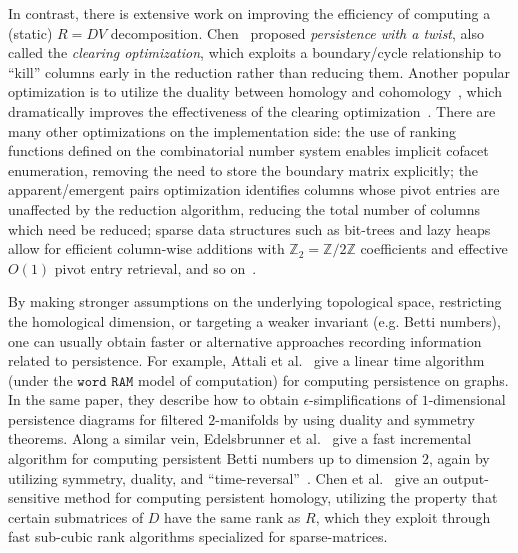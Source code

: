 \documentclass[sn-mathphys]{sn-jnl}
\begin{document}
In contrast, there is extensive work  on improving the efficiency of computing a (static) $R = DV$ decomposition. Chen~\cite{chen2011persistent} proposed \emph{persistence with a twist}, also called the \emph{clearing optimization}, which exploits a boundary/cycle relationship to ``kill'' columns early in the reduction rather than reducing them. 
Another popular optimization is to utilize the duality between   homology and cohomology~\cite{de2011dualities}, which dramatically improves the effectiveness of the clearing optimization~\cite{bauer2021ripser}. 
There are many other optimizations on the implementation side: the use of ranking functions defined on the combinatorial number system enables implicit cofacet enumeration, removing the need to store the boundary matrix explicitly; the apparent/emergent pairs optimization identifies columns whose pivot entries are unaffected by the reduction algorithm, reducing the total number of columns which need be reduced; sparse data structures such as bit-trees and lazy heaps allow for efficient column-wise additions with $\mathbb{Z}_2 = \mathbb{Z}/2\mathbb{Z}$ coefficients and effective $O(1)$ pivot entry retrieval, and so on~\cite{bauer2021ripser, bauer2017phat}. 

By making stronger assumptions on the underlying topological space, restricting the homological dimension, or targeting  a weaker invariant (e.g. Betti numbers), one can usually obtain  faster or alternative approaches  recording information related to persistence.
For example, Attali et al.~\cite{attali2009persistence} give a linear time algorithm (under the $\texttt{word RAM}$ model of computation) for computing persistence on graphs.
In the same paper, they describe how to obtain $\epsilon$-simplifications of $1$-dimensional persistence diagrams for filtered $2$-manifolds by using duality and symmetry theorems. 
Along a similar vein, Edelsbrunner et al.~\cite{edelsbrunner2000topological} give a fast incremental algorithm for computing persistent Betti numbers up to dimension $2$, again by utilizing symmetry, duality, and ``time-reversal''~\cite{delfinado1995incremental}. Chen et al.~\cite{chen2013output} give an output-sensitive method for computing persistent homology,  utilizing the property that certain submatrices of  $D$ have the same rank as  $R$, which they exploit through fast sub-cubic rank algorithms specialized for sparse-matrices.  
\end{document}
